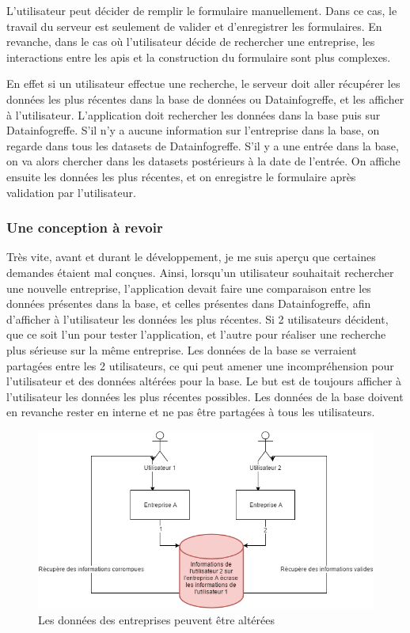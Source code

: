 \documentclass[french]{article}
\begin{document}
{L'utilisateur peut décider de remplir le formulaire manuellement. Dans ce cas, le travail du serveur est seulement de valider et d'enregistrer les formulaires. En revanche, dans le cas où l'utilisateur décide de rechercher une entreprise, les interactions entre les apis et la construction du formulaire sont plus complexes. 

En effet si un utilisateur effectue une recherche, le serveur doit aller récupérer les données les plus récentes dans la base de données ou Datainfogreffe, et les afficher à l'utilisateur. L'application doit rechercher les données dans la base puis sur Datainfogreffe. S'il n'y a aucune information sur l'entreprise dans la base, on regarde dans tous les datasets de Datainfogreffe. S'il y a une entrée dans la base, on va alors chercher dans les datasets postérieurs à la date de l'entrée. On affiche ensuite les données les plus récentes, et on enregistre le formulaire après validation par l'utilisateur.

\subsubsection{Une conception à revoir}

Très vite, avant et durant le développement, je me suis aperçu que certaines demandes étaient mal conçues. Ainsi, lorsqu'un utilisateur souhaitait rechercher une nouvelle entreprise, l'application devait faire une comparaison entre les données présentes dans la base, et celles présentes dans Datainfogreffe, afin d'afficher à l'utilisateur les données les plus récentes. Si 2 utilisateurs décident, que ce soit l'un pour tester l'application, et l'autre pour réaliser une recherche plus sérieuse sur la même entreprise. Les données de la base se verraient partagées entre les 2 utilisateurs, ce qui peut amener une incompréhension pour l'utilisateur et des données altérées pour la base. Le but est de toujours afficher à l'utilisateur les données les plus récentes possibles. Les données de la base doivent en revanche rester en interne et ne pas être partagées à tous les utilisateurs.

\begin{figure}[ht]
\centering
\includegraphics[width=\textwidth, draft=false]{data_problem.png}
\caption{Les données des entreprises peuvent être altérées}
\label{fig1}
\end{figure}

}
\end{document}
